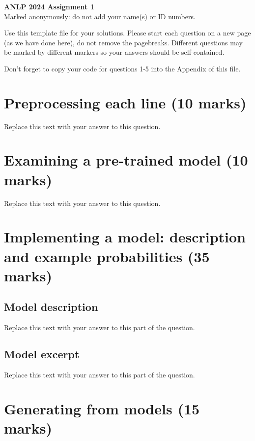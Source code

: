 \documentclass[12pt]{article}
\begin{document}
\begin{center}
{\Large\bf ANLP 2024 Assignment 1}\\ \large Marked anonymously: do not add your name(s) or ID numbers.\\[2mm]
\end{center}

Use this template file for your solutions. Please start each question on a new page (as we have done here), do not remove the pagebreaks. Different questions may be marked by different markers so your answers should be self-contained.

Don't forget to copy your code for questions 1-5 into the Appendix of this file.

\section{Preprocessing each line (10 marks)}

Replace this text with your answer to this question.


\pagebreak
\section{Examining a pre-trained model (10 marks)}

Replace this text with your answer to this question.

\pagebreak
\section{Implementing a model: description and example probabilities (35 marks)}

\subsection{Model description}

Replace this text with your answer to this part of the question.

\subsection{Model excerpt}

Replace this text with your answer to this part of the question.


\pagebreak
\section{Generating from models (15 marks)}
\end{document}

